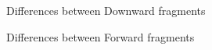 \documentclass{article}
\begin{document}
\begin{figure}
  \begin{center}
    
  \end{center}
  \caption{Differences between \textsf{Downward} fragments}
\end{figure}

\begin{figure}
  \begin{center}
    
  \end{center}
  \caption{Differences between \textsf{Forward} fragments}
\end{figure}
\end{document}
